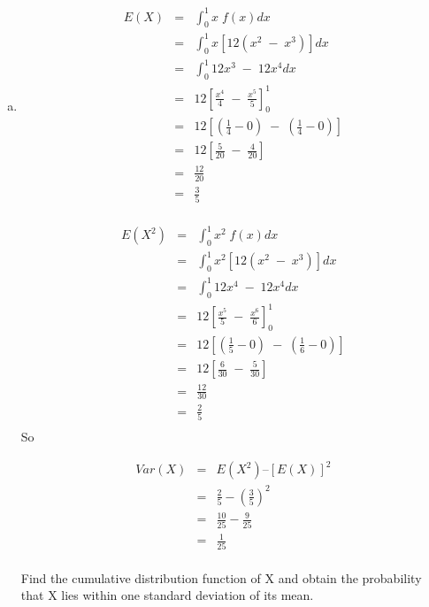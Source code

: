 \documentclass[a4paper,12pt]{article}
\begin{document}
\begin{enumerate}[(a)]

[At the mode, f (x) = 12(2/3)2(1/3) = 16/9.]



\newpage
\begin{framed}
(iii) Find the mean and variance of X.

\end{framed}
\item  
\begin{eqnarray*}
E(X) &=& \int^{1}_{0} x \;f(x) dx \\
&=& \int^{1}_{0} x[12(x^2\;-\;x^3)] dx \\
&=& \int^{1}_{0} 12x^3\;-\;12x^4 dx \\
&=& 12 \left[ \frac{x^4}{4} \;-\; \frac{x^5}{5}\right]^1_0\\
&=& 12 \left[ \left( \frac{1}{4}- 0 \right) \;-\; \left( \frac{1}{4}- 0 \right)  \right]\\
&=& 12 \left[  \frac{5}{20} \;-\; \frac{4}{20} \right]\\
&=&  \frac{12}{20} \\
&=&  \frac{3}{5}\\
\end{eqnarray*}


\begin{eqnarray*}
E(X^2) &=& \int^{1}_{0} x^2 \;f(x) dx \\
&=& \int^{1}_{0} x^2[12(x^2\;-\;x^3)] dx \\
&=& \int^{1}_{0} 12x^4\;-\;12x^4 dx \\
&=& 12 \left[ \frac{x^5}{5} \;-\; \frac{x^6}{6}\right]^1_0\\
&=& 12 \left[ \left( \frac{1}{5}- 0 \right) \;-\; \left( \frac{1}{6}- 0 \right)  \right]\\
&=& 12 \left[  \frac{6}{30} \;-\; \frac{5}{30} \right]\\
&=&  \frac{12}{30} \\
&=&  \frac{2}{5}\\
\end{eqnarray*}
So 

\begin{eqnarray*}
Var(X) &=& E(X^2) – [E(X)]^2 \\
 &=& \frac{2}{5} - \left(\frac{3}{5}\right)^2 \\
 &=& \frac{10}{25} - \frac{9}{25} \\
 &=& \frac{1}{25} \\
\end{eqnarray*}
\newpage
\begin{framed}
 Find the cumulative distribution function of X and obtain the probability that X
lies within one standard deviation of its mean.


\end{framed}
\end{enumerate}
\end{document}
